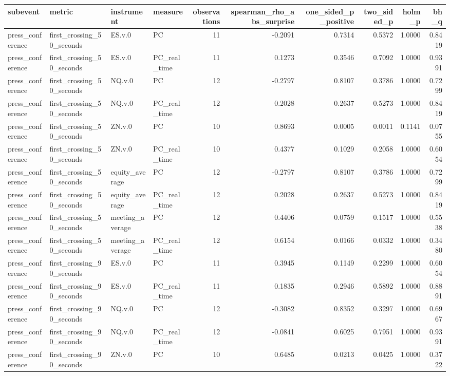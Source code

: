 \begin{tabular}{llllrrrrrr}
\toprule
subevent & metric & instrument & measure & observations & spearman_rho_abs_surprise & one_sided_p_positive & two_sided_p & holm_p & bh_q \\
\midrule
press_conference & first_crossing_50_seconds & ES.v.0 & PC & 11 & -0.2091 & 0.7314 & 0.5372 & 1.0000 & 0.8419 \\
press_conference & first_crossing_50_seconds & ES.v.0 & PC_real_time & 11 & 0.1273 & 0.3546 & 0.7092 & 1.0000 & 0.9391 \\
press_conference & first_crossing_50_seconds & NQ.v.0 & PC & 12 & -0.2797 & 0.8107 & 0.3786 & 1.0000 & 0.7299 \\
press_conference & first_crossing_50_seconds & NQ.v.0 & PC_real_time & 12 & 0.2028 & 0.2637 & 0.5273 & 1.0000 & 0.8419 \\
press_conference & first_crossing_50_seconds & ZN.v.0 & PC & 10 & 0.8693 & 0.0005 & 0.0011 & 0.1141 & 0.0755 \\
press_conference & first_crossing_50_seconds & ZN.v.0 & PC_real_time & 10 & 0.4377 & 0.1029 & 0.2058 & 1.0000 & 0.6054 \\
press_conference & first_crossing_50_seconds & equity_average & PC & 12 & -0.2797 & 0.8107 & 0.3786 & 1.0000 & 0.7299 \\
press_conference & first_crossing_50_seconds & equity_average & PC_real_time & 12 & 0.2028 & 0.2637 & 0.5273 & 1.0000 & 0.8419 \\
press_conference & first_crossing_50_seconds & meeting_average & PC & 12 & 0.4406 & 0.0759 & 0.1517 & 1.0000 & 0.5538 \\
press_conference & first_crossing_50_seconds & meeting_average & PC_real_time & 12 & 0.6154 & 0.0166 & 0.0332 & 1.0000 & 0.3480 \\
press_conference & first_crossing_90_seconds & ES.v.0 & PC & 11 & 0.3945 & 0.1149 & 0.2299 & 1.0000 & 0.6054 \\
press_conference & first_crossing_90_seconds & ES.v.0 & PC_real_time & 11 & 0.1835 & 0.2946 & 0.5892 & 1.0000 & 0.8891 \\
press_conference & first_crossing_90_seconds & NQ.v.0 & PC & 12 & -0.3082 & 0.8352 & 0.3297 & 1.0000 & 0.6967 \\
press_conference & first_crossing_90_seconds & NQ.v.0 & PC_real_time & 12 & -0.0841 & 0.6025 & 0.7951 & 1.0000 & 0.9391 \\
press_conference & first_crossing_90_seconds & ZN.v.0 & PC & 10 & 0.6485 & 0.0213 & 0.0425 & 1.0000 & 0.3722 \\

\end{tabular}
